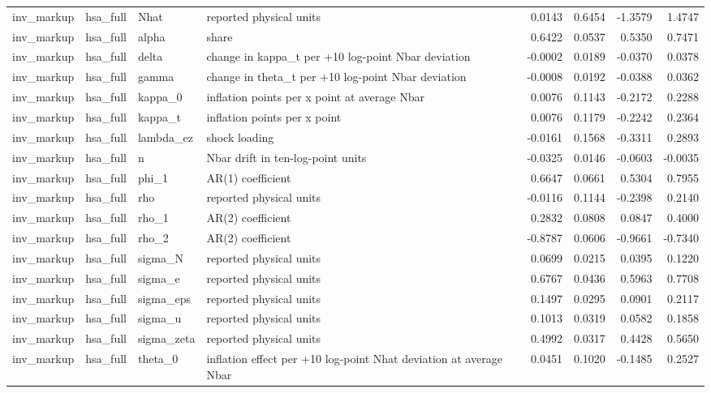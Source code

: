 \begin{tabular}{llllrrrr}
inv\_markup & hsa\_full & Nhat & reported physical units & 0.0143 & 0.6454 & -1.3579 & 1.4747 \\
inv\_markup & hsa\_full & alpha & share & 0.6422 & 0.0537 & 0.5350 & 0.7471 \\
inv\_markup & hsa\_full & delta & change in kappa\_t per +10 log-point Nbar deviation & -0.0002 & 0.0189 & -0.0370 & 0.0378 \\
inv\_markup & hsa\_full & gamma & change in theta\_t per +10 log-point Nbar deviation & -0.0008 & 0.0192 & -0.0388 & 0.0362 \\
inv\_markup & hsa\_full & kappa\_0 & inflation points per x point at average Nbar & 0.0076 & 0.1143 & -0.2172 & 0.2288 \\
inv\_markup & hsa\_full & kappa\_t & inflation points per x point & 0.0076 & 0.1179 & -0.2242 & 0.2364 \\
inv\_markup & hsa\_full & lambda\_ez & shock loading & -0.0161 & 0.1568 & -0.3311 & 0.2893 \\
inv\_markup & hsa\_full & n & Nbar drift in ten-log-point units & -0.0325 & 0.0146 & -0.0603 & -0.0035 \\
inv\_markup & hsa\_full & phi\_1 & AR(1) coefficient & 0.6647 & 0.0661 & 0.5304 & 0.7955 \\
inv\_markup & hsa\_full & rho & reported physical units & -0.0116 & 0.1144 & -0.2398 & 0.2140 \\
inv\_markup & hsa\_full & rho\_1 & AR(2) coefficient & 0.2832 & 0.0808 & 0.0847 & 0.4000 \\
inv\_markup & hsa\_full & rho\_2 & AR(2) coefficient & -0.8787 & 0.0606 & -0.9661 & -0.7340 \\
inv\_markup & hsa\_full & sigma\_N & reported physical units & 0.0699 & 0.0215 & 0.0395 & 0.1220 \\
inv\_markup & hsa\_full & sigma\_e & reported physical units & 0.6767 & 0.0436 & 0.5963 & 0.7708 \\
inv\_markup & hsa\_full & sigma\_eps & reported physical units & 0.1497 & 0.0295 & 0.0901 & 0.2117 \\
inv\_markup & hsa\_full & sigma\_u & reported physical units & 0.1013 & 0.0319 & 0.0582 & 0.1858 \\
inv\_markup & hsa\_full & sigma\_zeta & reported physical units & 0.4992 & 0.0317 & 0.4428 & 0.5650 \\
inv\_markup & hsa\_full & theta\_0 & inflation effect per +10 log-point Nhat deviation at average Nbar & 0.0451 & 0.1020 & -0.1485 & 0.2527 \\

\end{tabular}
